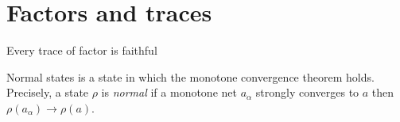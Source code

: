 \documentclass{../note}
\begin{document}
\begin{prb}[Representations of $K(H)$]
\end{prb}



\begin{prb}
\end{prb}

\begin{prb}
\end{prb}

\begin{prb}
\end{prb}

\begin{prb}
\end{prb}

\section{Factors and traces}
Every trace of factor is faithful


\begin{prb}
Normal states is a state in which the monotone convergence theorem holds.
Precisely, a state $\rho$ is \emph{normal} if a monotone net $a_\alpha$ strongly converges to $a$ then $\rho(a_\alpha)\to\rho(a)$.
\end{prb}
\end{document}
